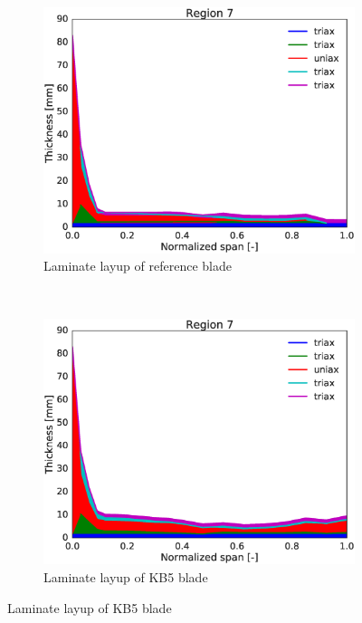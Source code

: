 \begin{figure}[tph]
\begin{subfigure}{0.50\textwidth}
\includegraphics[width=\linewidth]{figures/KB6_final/baseline_laminate_layers_r07.eps}
\caption{Laminate layup of reference blade}
\label{subfig:baseline_layers_r07}
\end{subfigure}
 ~
\begin{subfigure}{0.50\textwidth}
\includegraphics[width=\linewidth]{figures/KB6_final/KB5_laminate_layers_r07.eps}
\caption{Laminate layup of KB5 blade}
\label{subfig:KB5_layers_r07}
\end{subfigure}


\end{figure}
